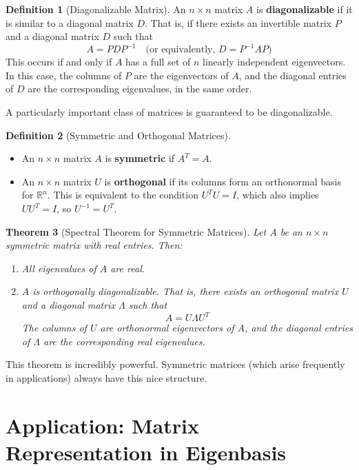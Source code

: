 \documentclass[11pt]{article}
\newtheorem{theorem}{Theorem}[section]
\theoremstyle{definition}
\newtheorem{definition}[theorem]{Definition}
\theoremstyle{remark}
\begin{document}
\begin{definition}[Diagonalizable Matrix]
An $n \times n$ matrix $A$ is \textbf{diagonalizable} if it is similar to a diagonal matrix $D$. That is, if there exists an invertible matrix $P$ and a diagonal matrix $D$ such that
\[ A = P D P^{-1} \quad \text{(or equivalently, } D = P^{-1} A P \text{)} \]
This occurs if and only if $A$ has a full set of $n$ linearly independent eigenvectors. In this case, the columns of $P$ are the eigenvectors of $A$, and the diagonal entries of $D$ are the corresponding eigenvalues, in the same order.
\end{definition}

A particularly important class of matrices is guaranteed to be diagonalizable.

\begin{definition}[Symmetric and Orthogonal Matrices]
\begin{itemize}
    \item An $n \times n$ matrix $A$ is \textbf{symmetric} if $A^T = A$.
    \item An $n \times n$ matrix $U$ is \textbf{orthogonal} if its columns form an orthonormal basis for $\mathbb{R}^n$. This is equivalent to the condition $U^T U = I$, which also implies $U U^T = I$, so $U^{-1} = U^T$.
\end{itemize}
\end{definition}

\begin{theorem}[Spectral Theorem for Symmetric Matrices]
Let $A$ be an $n \times n$ symmetric matrix with real entries. Then:
\begin{enumerate}
    \item All eigenvalues of $A$ are real.
    \item $A$ is orthogonally diagonalizable. That is, there exists an orthogonal matrix $U$ and a diagonal matrix $\Lambda$ such that
    \[ A = U \Lambda U^T \]
    The columns of $U$ are orthonormal eigenvectors of $A$, and the diagonal entries of $\Lambda$ are the corresponding real eigenvalues.
\end{enumerate}
\end{theorem}
This theorem is incredibly powerful. Symmetric matrices (which arise frequently in applications) always have this nice structure.

\section{Application: Matrix Representation in Eigenbasis}
\end{document}
